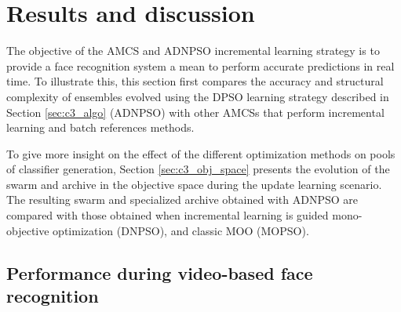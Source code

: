 \section{Results and discussion}
\label{sec:c3_res_dis}

The objective of the AMCS and ADNPSO incremental learning strategy is to provide a face recognition system a mean to perform accurate predictions in real time.
To illustrate this, this section first compares the accuracy and structural complexity of ensembles evolved using the DPSO learning strategy described in Section \ref{sec:c3_algo} (ADNPSO) with other AMCSs that perform incremental learning and batch references methods.

To give more insight on the effect of the different optimization methods on pools of classifier generation, Section \ref{sec:c3_obj_space} presents the evolution of the swarm and archive in the objective space during the update learning scenario. %
The resulting swarm and specialized archive obtained with ADNPSO are compared with those obtained when incremental learning is guided mono-objective optimization (DNPSO), and classic MOO (MOPSO).

\subsection{Performance during video-based face recognition}
\label{sec:c3_perf}


